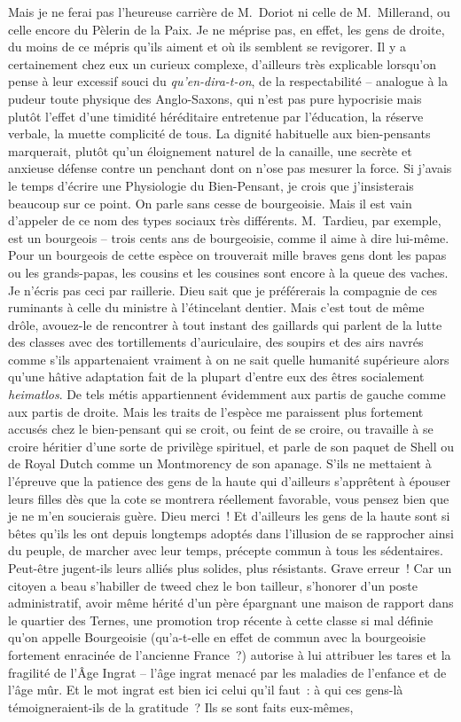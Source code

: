 \documentclass[french,twoside]{book} %
\begin{document}
\noindent Mais je ne ferai pas l’heureuse carrière de M. Doriot ni celle de M. Millerand, ou celle encore du Pèlerin de la Paix. Je ne méprise pas, en effet, les gens de droite, du moins de ce mépris qu’ils aiment et où ils semblent se revigorer. Il y a certainement chez eux un curieux complexe, d’ailleurs très explicable lorsqu’on pense à leur excessif souci du \emph{qu’en-dira-t-on}, de la respectabilité – analogue à la pudeur toute physique des Anglo-Saxons, qui n’est pas pure hypocrisie mais plutôt l’effet d’une timidité héréditaire entretenue par l’éducation, la réserve verbale, la muette complicité de tous. La dignité habituelle aux bien-pensants marquerait, plutôt qu’un éloignement naturel de la canaille, une secrète et anxieuse défense contre un penchant dont on n’ose pas mesurer la force. Si j’avais le temps d’écrire une Physiologie du Bien-Pensant, je crois que j’insisterais beaucoup sur ce point. On parle sans cesse de bourgeoisie. Mais il est vain d’appeler de ce nom des types sociaux très différents. M. Tardieu, par exemple, est un bourgeois – trois cents ans de bourgeoisie, comme il aime à dire lui-même. Pour un bourgeois de cette espèce on trouverait mille braves gens dont les papas ou les grands-papas, les cousins et les cousines sont encore à la queue des vaches. Je n’écris pas ceci par raillerie. Dieu sait que je préférerais la compagnie de ces ruminants à celle du ministre à l’étincelant dentier. Mais c’est tout de même drôle, avouez-le de rencontrer à tout instant des gaillards qui parlent de la lutte des classes avec des tortillements d’auriculaire, des soupirs et des airs navrés comme s’ils appartenaient vraiment à on ne sait quelle humanité supérieure alors qu’une hâtive adaptation fait de la plupart d’entre eux des êtres socialement \emph{heimatlos}. De tels métis appartiennent évidemment aux partis de gauche comme aux partis de droite. Mais les traits de l’espèce me paraissent plus fortement accusés chez le bien-pensant qui se croit, ou feint de se croire, ou travaille à se croire héritier d’une sorte de privilège spirituel, et parle de son paquet de Shell ou de Royal Dutch comme un Montmorency de son apanage. S’ils ne mettaient à l’épreuve que la patience des gens de la haute qui d’ailleurs s’apprêtent à épouser leurs filles dès que la cote se montrera réellement favorable, vous pensez bien que je ne m’en soucierais guère. Dieu merci ! Et d’ailleurs les gens de la haute sont si bêtes qu’ils les ont depuis longtemps adoptés dans l’illusion de se rapprocher ainsi du peuple, de marcher avec leur temps, précepte commun à tous les sédentaires. Peut-être jugent-ils leurs alliés plus solides, plus résistants. Grave erreur ! Car un citoyen a beau s’habiller de tweed chez le bon tailleur, s’honorer d’un poste administratif, avoir même hérité d’un père épargnant une maison de rapport dans le quartier des Ternes, une promotion trop récente à cette classe si mal définie qu’on appelle Bourgeoisie (qu’a-t-elle en effet de commun avec la bourgeoisie fortement enracinée de l’ancienne France ?) autorise à lui attribuer les tares et la fragilité de l’Âge Ingrat – l’âge ingrat menacé par les maladies de l’enfance et de l’âge mûr. Et le mot ingrat est bien ici celui qu’il faut : à qui ces gens-là témoigneraient-ils de la gratitude ? Ils se sont faits eux-mêmes, 
\end{document}
